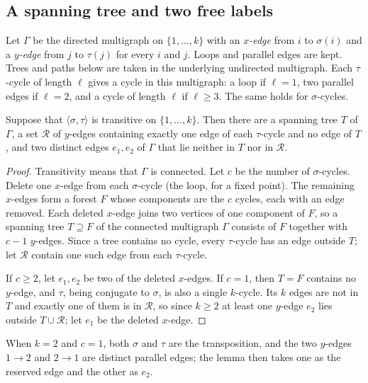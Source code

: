 \documentclass[11pt,colorlinks]{charlie}
\newcommand{\gen}[1]{\langle #1\rangle}
\begin{document}
\subsection{A spanning tree and two free labels}

Let $\Gamma$ be the directed multigraph on $\{1,\dots,k\}$ with an \emph{$x$-edge} from $i$ to $\sigma(i)$ and a \emph{$y$-edge} from $j$ to $\tau(j)$ for every $i$ and $j$. Loops and parallel edges are kept. Trees and paths below are taken in the underlying undirected multigraph. Each $\tau$-cycle of length $\ell$ gives a cycle in this multigraph: a loop if $\ell=1$, two parallel edges if $\ell=2$, and a cycle of length $\ell$ if $\ell\ge3$. The same holds for $\sigma$-cycles.

\begin{lemma}\label{lem:tree}
Suppose that $\gen{\sigma,\tau}$ is transitive on $\{1,\dots,k\}$. Then there are a spanning tree $T$ of $\Gamma$, a set $\mathcal R$ of $y$-edges containing exactly one edge of each $\tau$-cycle and no edge of $T$, and two distinct edges $e_1,e_2$ of $\Gamma$ that lie neither in $T$ nor in $\mathcal R$.
\end{lemma}

\begin{proof}
Transitivity means that $\Gamma$ is connected. Let $c$ be the number of $\sigma$-cycles. Delete one $x$-edge from each $\sigma$-cycle (the loop, for a fixed point). The remaining $x$-edges form a forest $F$ whose components are the $c$ cycles, each with an edge removed. Each deleted $x$-edge joins two vertices of one component of $F$, so a spanning tree $T\supseteq F$ of the connected multigraph $\Gamma$ consists of $F$ together with $c-1$ $y$-edges. Since a tree contains no cycle, every $\tau$-cycle has an edge outside $T$; let $\mathcal R$ contain one such edge from each $\tau$-cycle.

If $c\ge2$, let $e_1,e_2$ be two of the deleted $x$-edges. If $c=1$, then $T=F$ contains no $y$-edge, and $\tau$, being conjugate to $\sigma$, is also a single $k$-cycle. Its $k$ edges are not in $T$ and exactly one of them is in $\mathcal R$, so since $k\ge2$ at least one $y$-edge $e_2$ lies outside $T\cup\mathcal R$; let $e_1$ be the deleted $x$-edge.
\end{proof}

When $k=2$ and $c=1$, both $\sigma$ and $\tau$ are the transposition, and the two $y$-edges $1\to2$ and $2\to1$ are distinct parallel edges; the lemma then takes one as the reserved edge and the other as $e_2$.
\end{document}
